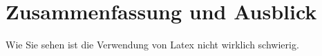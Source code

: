 \chapter{Zusammenfassung und Ausblick}

Wie Sie sehen ist die Verwendung von Latex nicht wirklich schwierig.
